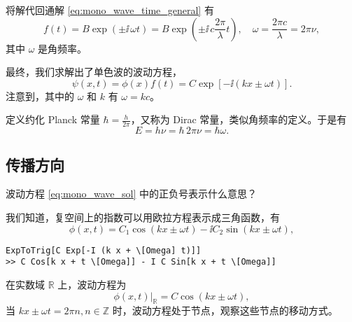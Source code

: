 将解代回通解 \eqref{eq:mono_wave_time_general} 有
\begin{equation}
    f(t) = B \exp\left(\pm\ii \,\omega t\right) = B \exp \left(\pm \ii \,c \frac{2\pi}\lambda t\right),\quad \omega = \frac{2\pi c}{\lambda} = 2\pi \nu,
\end{equation}
其中 $\omega$ 是角频率。

最终，我们求解出了单色波的波动方程，
\begin{equation}
    \psi(x,t) = \phi(x) f(t) = C \exp[-\ii(k x \pm \omega t)]. \label{eq:mono_wave_sol}
\end{equation}
注意到，其中的 $\omega$ 和 $k$ 有 $\omega = k c$。

定义约化 Planck 常量 $\hbar = \frac{h}{2\pi}$，又称为 Dirac 常量，类似角频率的定义。于是有
\begin{equation}
    E = h\nu = \hbar \, 2\pi \nu = \hbar \omega. 
\end{equation}
\subsection{传播方向}
波动方程 \eqref{eq:mono_wave_sol} 中的正负号表示什么意思？

我们知道，复空间上的指数可以用欧拉方程表示成三角函数，有
\begin{equation}
    \phi(x,t) = C_1 \cos (k x\pm \omega t)-\ii C_2 \sin (k x \pm \omega t),
\end{equation}
\begin{lstlisting}
ExpToTrig[C Exp[-I (k x + \[Omega] t)]]
>> C Cos[k x + t \[Omega]] - I C Sin[k x + t \[Omega]]
\end{lstlisting}
在实数域 $\mathbb{R}$ 上，波动方程为
\begin{equation}
    \phi(x,t)|_\mathbb{R} = C \cos(k x\pm \omega t),
\end{equation}
当 $kx\pm\omega t=2\pi n, n \in \mathbb{Z}$ 时，波动方程处于节点，观察这些节点的移动方式。

